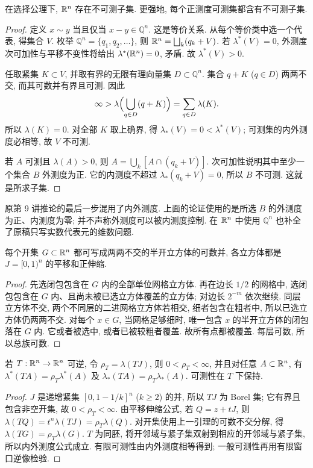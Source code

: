 \begin{theorem}\label{ra:c3:vitali}
在选择公理下, $\mathbb R^n$ 存在不可测子集. 更强地, 每个正测度可测集都含有不可测子集.
\end{theorem}
\begin{proof}
定义 $x\sim y$ 当且仅当 $x-y\in\mathbb Q^n$. 这是等价关系. 从每个等价类中选一个代表, 得集合 $V$. 枚举 $\mathbb Q^n=\{q_1,q_2,\ldots\}$, 则 $\mathbb R^n=\bigsqcup_k(q_k+V)$. 若 $\lambda^*(V)=0$, 外测度次可加性与平移不变性将给出 $\lambda^*(\mathbb R^n)=0$, 矛盾. 故 $\lambda^*(V)>0$.

任取紧集 $K\subset V$, 并取有界的无限有理向量集 $D\subset\mathbb Q^n$. 集合 $q+K$ ($q\in D$) 两两不交, 而其可数并有界且可测. 因此
\[
 \infty>\lambda\Bigl(\bigcup_{q\in D}(q+K)\Bigr)
 =\sum_{q\in D}\lambda(K).
\]
所以 $\lambda(K)=0$. 对全部 $K$ 取上确界, 得 $\lambda_*(V)=0<\lambda^*(V)$; 可测集的内外测度必相等, 故 $V$ 不可测.

若 $A$ 可测且 $\lambda(A)>0$, 则 $A=\bigcup_k[A\cap(q_k+V)]$. 次可加性说明其中至少一个集合 $B$ 外测度为正. 它的内测度不超过 $\lambda_*(q_k+V)=0$, 所以 $B$ 不可测. 这就是所求子集.
\end{proof}

\begin{remark}
原第 9 讲推论的最后一步混用了内外测度. 上面的论证使用的是所选 $B$ 的外测度为正、内测度为零; 并不声称外测度可以被内测度控制. 在 $\mathbb R^n$ 中使用 $\mathbb Q^n$ 也补全了原稿只写实数代表元的维数问题.
\end{remark}


\begin{lemma}\label{ra:c3:dyadic}
每个开集 $G\subset\mathbb R^n$ 都可写成两两不交的半开立方体的可数并, 各立方体都是 $J=[0,1)^n$ 的平移和正伸缩.
\end{lemma}
\begin{proof}
先选闭包包含在 $G$ 内的全部单位网格立方体. 再在边长 $1/2$ 的网格中, 选闭包包含在 $G$ 内、且尚未被已选立方体覆盖的立方体; 对边长 $2^{-m}$ 依次继续. 同层立方体不交, 两个不同层的二进网格立方体若相交, 细者包含在粗者中, 所以已选立方体仍两两不交. 对每个 $x\in G$, 当网格足够细时, 唯一包含 $x$ 的半开立方体的闭包落在 $G$ 内. 它或者被选中, 或者已被较粗者覆盖. 故所有点都被覆盖. 每层可数, 所以总族可数.
\end{proof}

\begin{lemma}\label{ra:c3:linearconstant}
若 $T:\mathbb R^n\to\mathbb R^n$ 可逆, 令 $\rho_T=\lambda(TJ)$, 则 $0<\rho_T<\infty$, 并且对任意 $A\subset\mathbb R^n$, 有 $\lambda^*(TA)=\rho_T\lambda^*(A)$ 及 $\lambda_*(TA)=\rho_T\lambda_*(A)$. 可测性在 $T$ 下保持.
\end{lemma}
\begin{proof}
$J$ 是递增紧集 $[0,1-1/k]^n$ ($k\ge2$) 的并, 所以 $TJ$ 为 Borel 集; 它有界且包含非空开集, 故 $0<\rho_T<\infty$. 由平移伸缩公式, 若 $Q=z+tJ$, 则 $\lambda(TQ)=t^n\lambda(TJ)=\rho_T\lambda(Q)$. 对开集使用上一引理的可数不交分解, 得 $\lambda(TG)=\rho_T\lambda(G)$. $T$ 为同胚, 将开邻域与紧子集双射到相应的开邻域与紧子集, 所以内外测度公式成立. 有限可测性由内外测度相等得到; 一般可测性再用有限窗口逆像检验.
\end{proof}

